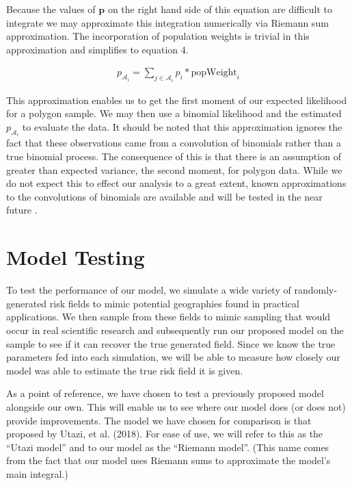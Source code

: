 \documentclass{article}
\begin{document}
Because the values of $\boldsymbol{p}$ on the right hand side of this equation are difficult to integrate we may approximate this integration numerically via Riemann sum approximation. The incorporation of population weights is trivial in this approximation and simplifies to equation 4.

\begin{align}\label{pRiemann}
p_{\mathcal{A}_i} = \sum_{j \in \mathcal{A}_i} p_i * \text{popWeight}_i
\end{align}

This approximation enables us to get the first moment of our expected likelihood for a polygon sample. We may then use a binomial likelihood and the estimated $p_{\mathcal{A}_i}$ to evaluate the data. It should be noted that this approximation ignores the fact that these observations came from a convolution of binomials rather than a true binomial process. The consequence of this is that there is an assumption of greater than expected variance, the second moment, for polygon data. While we do not expect this to effect our analysis to a great extent, known approximations to the convolutions of binomials are available and will be tested in the near future \cite{Liu2017}.

\section{Model Testing}\label{model testing}

To test the performance of our model, we simulate a wide variety of randomly-generated risk fields to mimic potential geographies found in practical applications. We then sample from these fields to mimic sampling that would occur in real scientific research and subsequently run our proposed model on the sample to see if it can recover the true generated field. Since we know the true parameters fed into each simulation, we will be able to measure how closely our model was able to estimate the true risk field it is given.

As a point of reference, we have chosen to test a previously proposed model alongside our own. This will enable us to see where our model does (or does not) provide improvements. The model we have chosen for comparison is that proposed by Utazi, et al. (2018). For ease of use, we will refer to this as the ``Utazi model'' and to our model as the ``Riemann model''. (This name comes from the fact that our model uses Riemann sums to approximate the model's main integral.)
\end{document}
